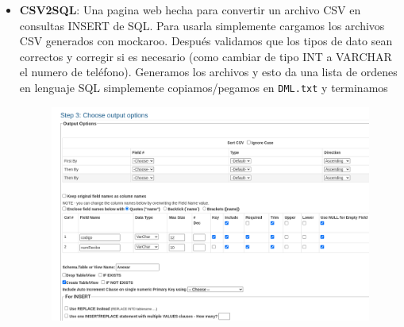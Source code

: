 \documentclass{exam}
\begin{document}
\begin{itemize}
		\pagebreak		
		
		\item \textbf{CSV2SQL}: Una pagina web hecha para convertir un archivo CSV en consultas INSERT de SQL. Para usarla simplemente cargamos los archivos CSV generados con mockaroo. Después validamos que los tipos de dato sean correctos y corregir si es necesario (como cambiar de tipo INT a VARCHAR el numero de teléfono). Generamos los archivos y esto da una lista de ordenes en lenguaje SQL simplemente copiamos/pegamos en \texttt{DML.txt} y terminamos
		
		\begin{figure}[h!]
			\includegraphics[scale=0.5]{csv2sql.png}
			\centering
		\end{figure}			
		
	\end{itemize}
\end{document}
